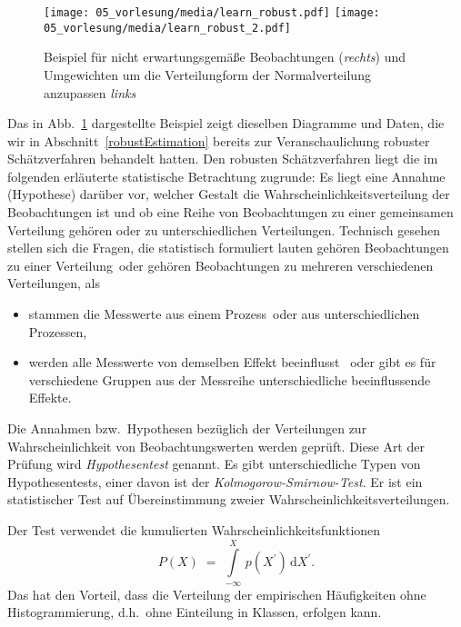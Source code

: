 \begin{figure}
\begin{center}
\texttt{[image: 05\_vorlesung/media/learn\_robust.pdf]}
\texttt{[image: 05\_vorlesung/media/learn\_robust\_2.pdf]}
\caption{Beispiel für nicht erwartungsgemäße Beobachtungen (\textsl{rechts}) und
Umgewichten um die Verteilungform der Normalverteilung anzupassen \textsl{links}}
\label{biasExample}
\end{center}
\end{figure}
Das in Abb.~\ref{biasExample} dargestellte Beispiel zeigt dieselben Diagramme und
Daten, die wir in Abschnitt~\ref{robustEstimation} bereits zur Veranschaulichung
robuster Schätzverfahren behandelt hatten. Den robusten Schätzverfahren liegt die
im folgenden erläuterte statistische Betrachtung zugrunde: Es liegt eine Annahme
(Hypothese) darüber vor, welcher Gestalt die Wahrscheinlichkeitsverteilung der
Beobachtungen ist und ob eine Reihe von Beobachtungen zu einer gemeinsamen Verteilung
gehören oder zu unterschiedlichen Verteilungen. Technisch gesehen stellen sich die
Fragen, die statistisch formuliert lauten \glqq gehören Beobachtungen zu einer
Verteilung\grqq ~oder \glqq gehören Beobachtungen zu mehreren verschiedenen Verteilungen\grqq,
als
\begin{itemize}
\item \glqq stammen die Messwerte aus einem Prozess\grqq ~oder \glqq aus unterschiedlichen
Prozessen\grqq,
\item \glqq werden alle Messwerte von demselben Effekt beeinflusst \grqq ~oder \glqq gibt es
für verschiedene Gruppen aus der Messreihe unterschiedliche beeinflussende Effekte\grqq.
\end{itemize}
Die Annahmen bzw.\ Hypothesen bezüglich der Verteilungen zur Wahrscheinlichkeit
von Beobachtungswerten werden geprüft. Diese Art der Prüfung wird \textsl{Hypothesentest}
genannt. Es gibt unterschiedliche Typen von Hypothesentests, einer davon ist
der \textsl{Kolmogorow-Smirnow-Test}.
Er ist ein statistischer Test auf Übereinstimmung zweier Wahrscheinlichkeitsverteilungen.

Der Test verwendet die kumulierten Wahrscheinlichkeitsfunktionen
\begin{equation}
P(X) \; = \; \int\limits_{-\infty}^X \, p(X^\prime) \, \mathrm{d} X^\prime .
\end{equation}
Das hat den Vorteil, dass
die Verteilung der empirischen Häufigkeiten ohne Histogrammierung, d.h.\ ohne Einteilung in Klassen,
erfolgen kann.


